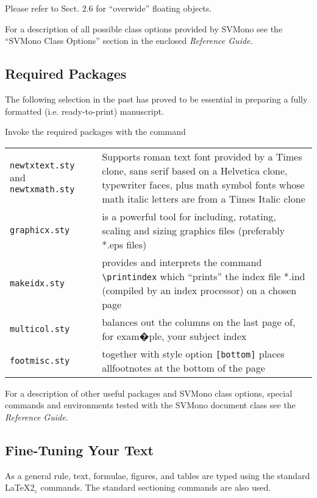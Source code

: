 \documentclass[graybox]{svmono}
\begin{document}
Please refer to Sect. 2.6 for ``overwide'' floating objects.

For a description of all possible class options provided by {\sc SVMono} see the ``{\sc SVMono} Class Options'' section in the enclosed {\it Reference Guide}.

\subsection{Required Packages}

The following selection in the past has proved to be essential in preparing a fully formatted (i.e. ready-to-print) manuscript.

\pagebreak

Invoke the required packages with the command

\cprotect\boxtext{\verb|\usepackage{}|}

\begin{tabular}{p{7.5pc}@{\qquad}p{18.5pc}}
{\tt newtxtext.sty} and {\tt newtxmath.sty} & Supports roman text font provided by a Times clone,  sans serif based on a Helvetica clone,  typewriter faces,  plus math symbol fonts whose math italic letters are from a Times Italic clone\\
{\tt graphicx.sty} & is a powerful tool for including, rotating, scaling and sizing graphics files (preferably *.eps files) \\
{\tt makeidx.sty} & provides and interprets the command \verb|\printindex| which ``prints'' the index file *.ind (compiled by an index processor) on a chosen page \\
{\tt multicol.sty} & balances out the columns on the last page of, for exam�ple, your subject index \\
{\tt footmisc.sty} & together with style option {\tt [bottom]} places all\break footnotes at the bottom of the page
\end{tabular}

For a description of other useful packages and {\sc SVMono} class options, special commands and environments tested with the {\sc SVMono} document class see the {\it Reference Guide}.


\subsection{Fine-Tuning Your Text}

 As a general rule, text, formulae, figures, and tables are typed using the standard \LaTeX2$_\varepsilon$ commands. The standard sectioning commands are also used.
\end{document}
